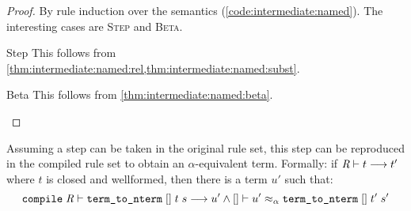 \begin{proof}
  By rule induction over the semantics (\cref{code:intermediate:named}).
  The interesting cases are \textsc{Step} and \textsc{Beta}.

  \begin{induction}
    \item[Step]
      This follows from \cref{thm:intermediate:named:rel,thm:intermediate:named:subst}.
    \item[Beta]
      This follows from \cref{thm:intermediate:named:beta}. \qedhere
  \end{induction}
\end{proof}

\begin{theorem}\label{thm:intermediate:named-compl}
  Assuming a step can be taken in the original rule set, this step can be reproduced in the compiled rule set to obtain an $\alpha$-equivalent term.
  Formally: if $\textit{R} \vdash t \longrightarrow t'$ where $t$ is closed and wellformed, then there is a term $u'$ such that:
  \[
    \texttt{\textup{compile}}\;\textit{R} \vdash \texttt{\textup{term\_to\_nterm}}\;[]\;t\;s \longrightarrow u' \wedge [] \vdash u' \approx_\alpha \texttt{\textup{term\_to\_nterm}}\;[]\;t'\;s'
  \]
\end{theorem}
